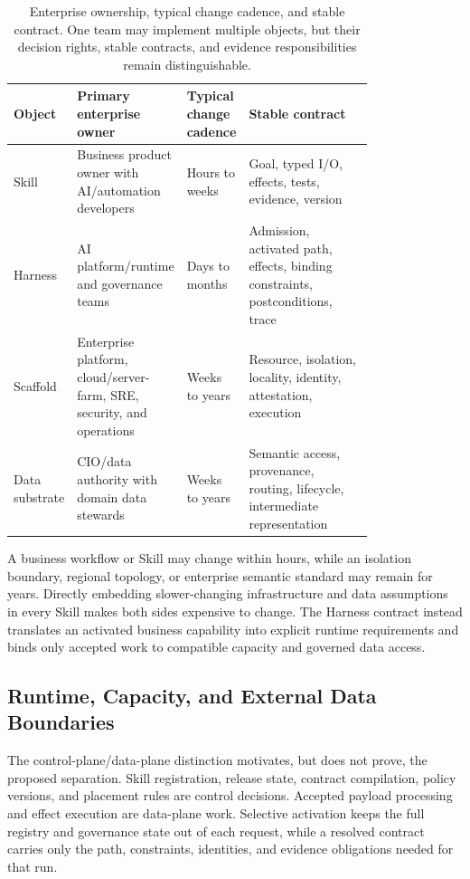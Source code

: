 \documentclass[11pt]{article}
\begin{document}
\begin{table}[t]
\centering
\caption{Enterprise ownership, typical change cadence, and stable contract. One team may implement multiple objects, but their decision rights, stable contracts, and evidence responsibilities remain distinguishable.}
\label{tab:ownership-cadence}
\begin{tabular}{lp{0.26\linewidth}p{0.15\linewidth}p{0.38\linewidth}}
\hline
Object & Primary enterprise owner & Typical change cadence & Stable contract \\
\hline
Skill & Business product owner with AI/automation developers & Hours to weeks & Goal, typed I/O, effects, tests, evidence, version \\
Harness & AI platform/runtime and governance teams & Days to months & Admission, activated path, effects, binding constraints, postconditions, trace \\
Scaffold & Enterprise platform, cloud/server-farm, SRE, security, and operations & Weeks to years & Resource, isolation, locality, identity, attestation, execution \\
Data substrate & CIO/data authority with domain data stewards & Weeks to years & Semantic access, provenance, routing, lifecycle, intermediate representation \\
\hline
\end{tabular}
\end{table}

A business workflow or Skill may change within hours, while an isolation boundary, regional topology, or enterprise semantic standard may remain for years. Directly embedding slower-changing infrastructure and data assumptions in every Skill makes both sides expensive to change. The Harness contract instead translates an activated business capability into explicit runtime requirements and binds only accepted work to compatible capacity and governed data access.

\subsection{Runtime, Capacity, and External Data Boundaries}

The control-plane/data-plane distinction motivates, but does not prove, the proposed separation. Skill registration, release state, contract compilation, policy versions, and placement rules are control decisions. Accepted payload processing and effect execution are data-plane work. Selective activation keeps the full registry and governance state out of each request, while a resolved contract carries only the path, constraints, identities, and evidence obligations needed for that run.
\end{document}
